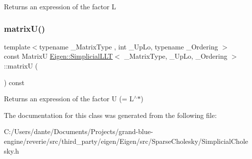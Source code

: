 \begin{DoxyReturn}{Returns}
an expression of the factor L 
\end{DoxyReturn}
\mbox{\label{class_eigen_1_1_simplicial_l_l_t_a23522d6444c344ddb14e48dbfac128ed}} 
\subsubsection{\texorpdfstring{matrixU()}{matrixU()}}
{\footnotesize\ttfamily template$<$typename \+\_\+\+Matrix\+Type , int \+\_\+\+Up\+Lo, typename \+\_\+\+Ordering $>$ \\
const MatrixU \mbox{\hyperlink{class_eigen_1_1_simplicial_l_l_t}{Eigen\+::\+Simplicial\+L\+LT}}$<$ \+\_\+\+Matrix\+Type, \+\_\+\+Up\+Lo, \+\_\+\+Ordering $>$\+::matrixU (\begin{DoxyParamCaption}{ }\end{DoxyParamCaption}) const\hspace{0.3cm}{\ttfamily [inline]}}

\begin{DoxyReturn}{Returns}
an expression of the factor U (= L$^\wedge$$\ast$) 
\end{DoxyReturn}


The documentation for this class was generated from the following file\+:\begin{DoxyCompactItemize}
\item 
C\+:/\+Users/dante/\+Documents/\+Projects/grand-\/blue-\/engine/reverie/src/third\+\_\+party/eigen/\+Eigen/src/\+Sparse\+Cholesky/Simplicial\+Cholesky.\+h\end{DoxyCompactItemize}
